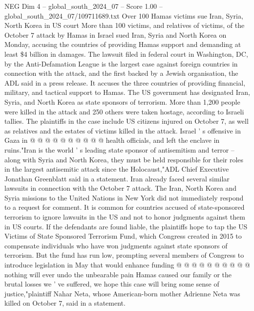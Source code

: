 \begin{textsample}{NEG Dim 4 – global\_south\_2024\_07 – Score 1.00 – global\_south\_2024\_07/109711689.txt}  \label{ex:f4_neg_345}
Over 100 Hamas victims sue Iran, Syria, North Korea in US court More than 100 victims, and relatives of victims, of the October 7 attack by Hamas in Israel sued Iran, Syria and North Korea on Monday, accusing the countries of providing Hamas support and demanding at least \$4 billion in damages.
The lawsuit filed in federal court in Washington, DC, by the Anti-Defamation League is the largest case against foreign countries in connection with the attack, and the first backed by a Jewish organisation, the ADL said in a press release.
It accuses the three countries of providing financial, military, and tactical support to Hamas.
The US government has designated Iran, Syria, and North Korea as state sponsors of terrorism.
More than 1,200 people were killed in the attack and 250 others were taken hostage, according to Israeli tallies.
The plaintiffs in the case include US citizens injured on October 7, as well as relatives and the estates of victims killed in the attack.
Israel ' s offensive in Gaza in @ @ @ @ @ @ @ @ @ @ health officials, and left the enclave in ruins."Iran is the world ' s leading state sponsor of antisemitism and terror -- along with Syria and North Korea, they must be held responsible for their roles in the largest antisemitic attack since the Holocaust,"ADL Chief Executive Jonathan Greenblatt said in a statement.
Iran already faced several similar lawsuits in connection with the October 7 attack.
The Iran, North Korea and Syria missions to the United Nations in New York did not immediately respond to a request for comment.
It is common for countries accused of state-sponsored terrorism to ignore lawsuits in the US and not to honor judgments against them in US courts.
If the defendants are found liable, the plaintiffs hope to tap the US Victims of State Sponsored Terrorism Fund, which Congress created in 2015 to compensate individuals who have won judgments against state sponsors of terrorism.
But the fund has run low, prompting several members of Congress to introduce legislation in May that would enhance funding @ @ @ @ @ @ @ @ @ @ nothing will ever undo the unbearable pain Hamas caused our family or the brutal losses we ' ve suffered, we hope this case will bring some sense of justice,"plaintiff Nahar Neta, whose American-born mother Adrienne Neta was killed on October 7, said in a statement.

\end{textsample}
